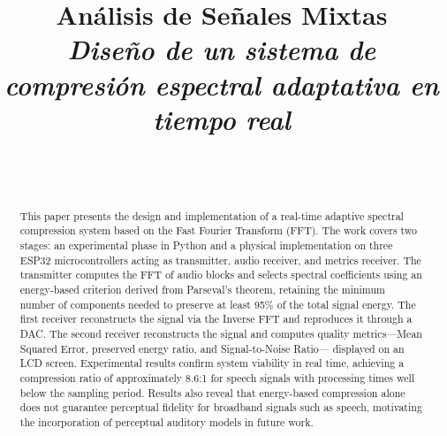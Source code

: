 \documentclass[12pt, journal]{IEEEtran}
\begin{document}

\title{Análisis de Señales Mixtas \\
\textit{Diseño de un sistema de compresión espectral adaptativa en tiempo real}}

\author{
\\
\vspace{\baselineskip}\\
}

\maketitle

\begin{abstract}
This paper presents the design and implementation of a real-time adaptive spectral
compression system based on the Fast Fourier Transform (FFT). The work covers two
stages: an experimental phase in Python and a physical implementation on three ESP32
microcontrollers acting as transmitter, audio receiver, and metrics receiver.
The transmitter computes the FFT of audio blocks and selects spectral coefficients
using an energy-based criterion derived from Parseval's theorem, retaining the minimum
number of components needed to preserve at least 95\% of the total signal energy.
The first receiver reconstructs the signal via the Inverse FFT and reproduces it
through a DAC. The second receiver reconstructs the signal and computes quality
metrics—Mean Squared Error, preserved energy ratio, and Signal-to-Noise Ratio—
displayed on an LCD screen. Experimental results confirm system viability in real
time, achieving a compression ratio of approximately 8.6:1 for speech signals with
processing times well below the sampling period. Results also reveal that
energy-based compression alone does not guarantee perceptual fidelity for broadband
signals such as speech, motivating the incorporation of perceptual auditory models
in future work.
\end{abstract}
\end{document}
